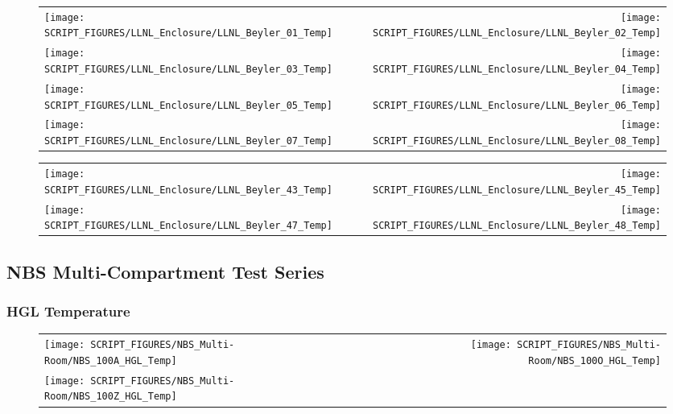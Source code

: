 \begin{figure}[!ht]
\begin{tabular*}{\textwidth}{l@{\extracolsep{\fill}}r}
\texttt{[image: SCRIPT\_FIGURES/LLNL\_Enclosure/LLNL\_Beyler\_01\_Temp]} &
\texttt{[image: SCRIPT\_FIGURES/LLNL\_Enclosure/LLNL\_Beyler\_02\_Temp]} \\
\texttt{[image: SCRIPT\_FIGURES/LLNL\_Enclosure/LLNL\_Beyler\_03\_Temp]} &
\texttt{[image: SCRIPT\_FIGURES/LLNL\_Enclosure/LLNL\_Beyler\_04\_Temp]} \\
\texttt{[image: SCRIPT\_FIGURES/LLNL\_Enclosure/LLNL\_Beyler\_05\_Temp]} &
\texttt{[image: SCRIPT\_FIGURES/LLNL\_Enclosure/LLNL\_Beyler\_06\_Temp]} \\
\texttt{[image: SCRIPT\_FIGURES/LLNL\_Enclosure/LLNL\_Beyler\_07\_Temp]} &
\texttt{[image: SCRIPT\_FIGURES/LLNL\_Enclosure/LLNL\_Beyler\_08\_Temp]}
\end{tabular*}
\end{figure}

\begin{figure}[!ht]
\begin{tabular*}{\textwidth}{l@{\extracolsep{\fill}}r}
\texttt{[image: SCRIPT\_FIGURES/LLNL\_Enclosure/LLNL\_Beyler\_43\_Temp]} &
\texttt{[image: SCRIPT\_FIGURES/LLNL\_Enclosure/LLNL\_Beyler\_45\_Temp]} \\
\texttt{[image: SCRIPT\_FIGURES/LLNL\_Enclosure/LLNL\_Beyler\_47\_Temp]} &
\texttt{[image: SCRIPT\_FIGURES/LLNL\_Enclosure/LLNL\_Beyler\_48\_Temp]}
\end{tabular*}
\end{figure}

\clearpage

\subsection{NBS Multi-Compartment Test Series}

\subsubsection{HGL Temperature}

\begin{figure}[!ht]
\begin{tabular*}{\textwidth}{l@{\extracolsep{\fill}}r}
\texttt{[image: SCRIPT\_FIGURES/NBS\_Multi-Room/NBS\_100A\_HGL\_Temp]} &
\texttt{[image: SCRIPT\_FIGURES/NBS\_Multi-Room/NBS\_100O\_HGL\_Temp]} \\
\texttt{[image: SCRIPT\_FIGURES/NBS\_Multi-Room/NBS\_100Z\_HGL\_Temp]}
\end{tabular*}
\end{figure}

